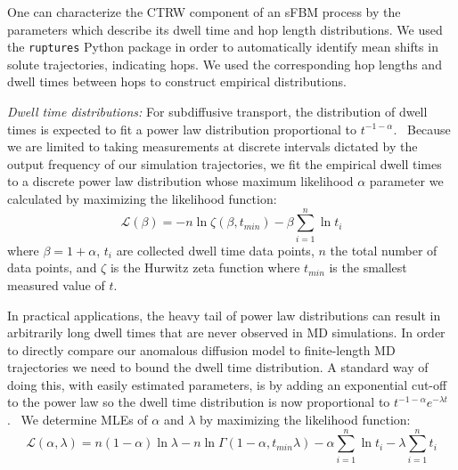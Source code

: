 \documentclass[aps,pre,preprint,groupedaddress]{revtex4-2}
\begin{document}
  One can characterize the CTRW component of an sFBM process by the parameters which describe
  its dwell time and hop length distributions. We used the \texttt{ruptures} Python
  package in order to automatically identify mean shifts in solute trajectories, 
  indicating hops.\cite{truong_ruptures:_2018} We used the corresponding hop lengths
  and dwell times between hops to construct empirical distributions.
  
  \textit{Dwell time distributions:} For subdiffusive transport, the distribution 
  of dwell times is expected to fit a power law distribution 
  proportional to $t^{-1-\alpha}$.~\cite{meroz_toolbox_2015}
  Because we are limited to taking measurements at discrete intervals dictated by the output 
  frequency of our simulation trajectories, we fit the empirical dwell times
  to a discrete power law distribution whose maximum likelihood $\alpha$ 
  parameter we calculated by maximizing the likelihood function: 
  \begin{equation}
	\mathcal{L}(\beta) = -n\ln \zeta(\beta, t_{min}) -
	\beta\sum_{i=1}^{n} \ln t_i 
  \label{eqn:powerlaw_likelihood}
  \end{equation}
  where $\beta = 1 + \alpha$, $t_i$ are collected dwell time data points,
  $n$ the total number of data points, and $\zeta$ is the Hurwitz zeta function
  where $t_{min}$ is the smallest measured value of	$t$.~\cite{clauset_power-law_2009}
  
  In practical applications, the heavy tail of power law distributions can result in 
  arbitrarily long dwell times that are never observed in MD simulations. 
  In order to directly compare our anomalous diffusion model to finite-length MD 
  trajectories we need to bound the dwell time distribution. A standard way of 
  doing this, with easily estimated parameters, is by adding an exponential 
  cut-off to the power law so the dwell time distribution is now proportional 
  to $t^{-1 - \alpha}e^{-\lambda t}$.~\cite{newman_power_2005,clauset_power-law_2009}  %
  We determine MLEs of $\alpha$ and $\lambda$ by maximizing the likelihood function:~\cite{clauset_power-law_2009}
  \begin{equation}
    \mathcal{L}(\alpha, \lambda) = n(1 - \alpha)\ln\lambda - n\ln\Gamma(1 - \alpha, t_{min}\lambda) - \alpha\sum_{i=1}^{n}\ln t_i - \lambda\sum_{i=1}^n t_i
  \label{eqn:powerlaw_cutoff_likelihood}
  \end{equation}
  
\end{document}
